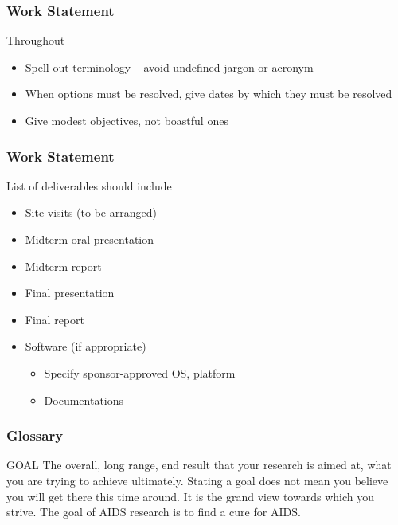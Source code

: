 \begin{frame}
    \frametitle{Work Statement}
    \begin{block}
        {Throughout}
        \begin{itemize}
            \item Spell out terminology -- avoid undefined jargon or acronym
            \item When options must be resolved, give dates by which they must
                be resolved
            \item Give modest objectives, not boastful ones
        \end{itemize}
    \end{block}
\end{frame}

\begin{frame}
    \frametitle{Work Statement}
    \begin{block}
        {List of deliverables should include}
        \begin{itemize}
            \item Site visits (to be arranged)
            \item Midterm oral presentation
            \item Midterm report
            \item Final presentation
            \item Final report
            \item Software (if appropriate) 
                \begin{itemize}
                    \item Specify sponsor-approved OS, platform
                    \item Documentations
                \end{itemize}
        \end{itemize}
    \end{block}
\end{frame}

\begin{frame}[allowframebreaks]
    \frametitle{Glossary}
    \begin{block}
        {GOAL} The overall, long range, end result that your research is aimed at, what
you are trying to achieve ultimately. Stating a goal does not mean you believe
you will get there this time around. It is the grand view towards which you
strive. The goal of AIDS research is to find a cure for AIDS.
\end{block}
\end{frame}

